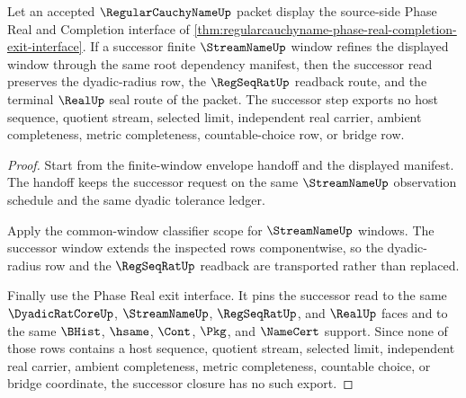\begin{theorem}
\label{thm:regular-cauchy-name-window-successor-closure}
Let an accepted $\RegularCauchyNameUp$ packet display the source-side Phase Real and Completion interface of \autoref{thm:regularcauchyname-phase-real-completion-exit-interface}. If a successor finite $\StreamNameUp$ window refines the displayed window through the same root dependency manifest, then the successor read preserves the dyadic-radius row, the $\RegSeqRatUp$ readback route, and the terminal $\RealUp$ seal route of the packet. The successor step exports no host sequence, quotient stream, selected limit, independent real carrier, ambient completeness, metric completeness, countable-choice row, or bridge row.
\end{theorem}
\begin{proof}
Start from the finite-window envelope handoff and the displayed manifest. The handoff keeps the successor request on the same $\StreamNameUp$ observation schedule and the same dyadic tolerance ledger.

Apply the common-window classifier scope for $\StreamNameUp$ windows. The successor window extends the inspected rows componentwise, so the dyadic-radius row and the $\RegSeqRatUp$ readback are transported rather than replaced.

Finally use the Phase Real exit interface. It pins the successor read to the same $\DyadicRatCoreUp$, $\StreamNameUp$, $\RegSeqRatUp$, and $\RealUp$ faces and to the same $\BHist$, $\hsame$, $\Cont$, $\Pkg$, and $\NameCert$ support. Since none of those rows contains a host sequence, quotient stream, selected limit, independent real carrier, ambient completeness, metric completeness, countable choice, or bridge coordinate, the successor closure has no such export.
\end{proof}

